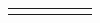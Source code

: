 \documentclass[letterpaper]{article}
\begin{document}
\begin{figure}[hbp]
\begin{minipage}{12.1146in}
\begin{flushleft}
\begin{supertabular}{|m{0.8913598in}|m{1.0997599in}|m{3.3018599in}|m{0.8809598in}|m{0.6198598in}|m{4.84626in}|}
{%
}
\end{supertabular}
\end{flushleft}
\end{minipage}
\end{figure}
\end{document}
